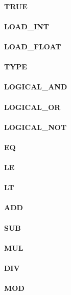 \documentclass[12pt,a4paper]{article}
\begin{document}
\paragraph{TRUE}
\paragraph{LOAD\_INT}
\paragraph{LOAD\_FLOAT}
\paragraph{TYPE}
\paragraph{LOGICAL\_AND}
\paragraph{LOGICAL\_OR}
\paragraph{LOGICAL\_NOT}
\paragraph{EQ}
\paragraph{LE}
\paragraph{LT}
\paragraph{ADD}
\paragraph{SUB}
\paragraph{MUL}
\paragraph{DIV}
\paragraph{MOD}
\end{document}
